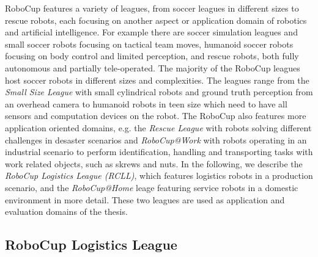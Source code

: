 RoboCup features a variety of leagues, from soccer leagues in
different sizes to rescue robots, each focusing on another aspect or
application domain of robotics and artificial intelligence.  For
example there are soccer simulation leagues and small soccer robots
focusing on tactical team moves, humanoid soccer robots focusing on
body control and limited perception, and rescue robots, both fully
autonomous and partially tele-operated.   The majority of the RoboCup leagues host soccer robots in
different sizes and complexities. The leagues range from the
\emph{Small Size League} with small cylindrical robots and ground
truth perception from an overhead camera to humanoid robots in teen
size which need to have all sensors and computation devices on the
robot. The RoboCup also features more application oriented domains,
e.g. the \emph{Rescue League} with robots solving different challenges
in desaster scenarios and \emph{RoboCup@Work} with robots operating in
an industrial scenario to perform identification, handling and
transporting tasks with work related objects, such as skrews and
nuts. In the following, we describe the \emph{RoboCup Logistics League
  (RCLL)}, which features logistics robots in a production scenario,
and the \emph{RoboCup@Home} leage featuring service robots in a
domestic environment in more detail. These two leagues are used as
application and evaluation domains of the thesis.

\subsection{RoboCup Logistics League}

